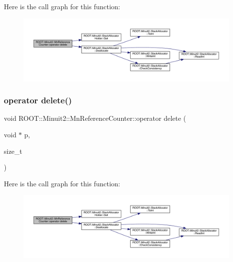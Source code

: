 Here is the call graph for this function\+:\nopagebreak
\begin{figure}[H]
\begin{center}
\leavevmode
\includegraphics[width=350pt]{dc/da2/classROOT_1_1Minuit2_1_1MnReferenceCounter_a792b5f277bb7df7c032c603eed5ae6f9_cgraph}
\end{center}
\end{figure}
\mbox{\label{classROOT_1_1Minuit2_1_1MnReferenceCounter_a792b5f277bb7df7c032c603eed5ae6f9}} 
\subsubsection{\texorpdfstring{operator delete()}{operator delete()}\hspace{0.1cm}{\footnotesize\ttfamily [2/3]}}
{\footnotesize\ttfamily void R\+O\+O\+T\+::\+Minuit2\+::\+Mn\+Reference\+Counter\+::operator delete (\begin{DoxyParamCaption}\item[{void $\ast$}]{p,  }\item[{size\+\_\+t}]{ }\end{DoxyParamCaption})\hspace{0.3cm}{\ttfamily [inline]}}

Here is the call graph for this function\+:
\nopagebreak
\begin{figure}[H]
\begin{center}
\leavevmode
\includegraphics[width=350pt]{dc/da2/classROOT_1_1Minuit2_1_1MnReferenceCounter_a792b5f277bb7df7c032c603eed5ae6f9_cgraph}
\end{center}
\end{figure}
\mbox{\label{classROOT_1_1Minuit2_1_1MnReferenceCounter_a792b5f277bb7df7c032c603eed5ae6f9}} 
